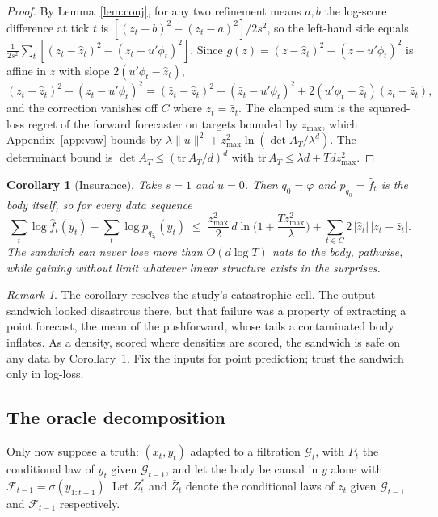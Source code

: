 \documentclass[article]{jss}
\newtheorem{corollary}{Corollary}
\theoremstyle{remark}
\newtheorem{remark}{Remark}
\newcommand{\zmax}{z_{\max}}
\begin{document}
\begin{proof}
By Lemma~\ref{lem:conj}, for any two refinement means $a, b$ the log-score
difference at tick $t$ is $[(z_t - b)^2 - (z_t - a)^2]/2s^2$, so the
left-hand side equals $\tfrac{1}{2s^2}\sum_t [(z_t - \hat z_t)^2 - (z_t -
u'\phi_t)^2]$. Since $g(z) = (z - \hat z_t)^2 - (z - u'\phi_t)^2$ is affine
in $z$ with slope $2(u'\phi_t - \hat z_t)$,
\[
(z_t - \hat z_t)^2 - (z_t - u'\phi_t)^2 = (\bar z_t - \hat z_t)^2 - (\bar z_t
- u'\phi_t)^2 + 2(u'\phi_t - \hat z_t)(z_t - \bar z_t),
\]
and the correction vanishes off $C$ where $z_t = \bar z_t$. The clamped sum
is the squared-loss regret of the forward forecaster on targets bounded by
$\zmax$, which Appendix~\ref{app:vaw} bounds by $\lambda\|u\|^2 + \zmax^2
\ln(\det A_T/\lambda^d)$. The determinant bound is
$\det A_T \le (\mathrm{tr}\, A_T/d)^d$ with $\mathrm{tr}\,A_T \le \lambda d +
T d \zmax^2$.
\end{proof}

\begin{corollary}[Insurance] \label{cor:insurance}
Take $s = 1$ and $u = 0$. Then $q_0 = \varphi$ and $p_{q_0} = \hat f_t$ is
the body itself, so for every data sequence
\[
\sum_t \log \hat f_t(y_t) - \sum_t \log p_{q_{\hat z_t}}(y_t)
\;\le\; \frac{\zmax^2}{2}\, d \ln\!\Big(1 + \frac{T \zmax^2}{\lambda}\Big)
+ \sum_{t\in C} 2\,|\hat z_t|\,|z_t - \bar z_t|.
\]
The sandwich can never lose more than $O(d \log T)$ nats to the body,
pathwise, while gaining without limit whatever linear structure exists in the
surprises.
\end{corollary}

\begin{remark}
The corollary resolves the study's catastrophic cell. The output sandwich
looked disastrous there, but that failure was a property of extracting a
point forecast, the mean of the pushforward, whose tails a contaminated body
inflates. As a density, scored where densities are scored, the sandwich is
safe on any data by Corollary~\ref{cor:insurance}. Fix the inputs for point
prediction; trust the sandwich only in log-loss.
\end{remark}

\subsection{The oracle decomposition}

Only now suppose a truth: $(x_t, y_t)$ adapted to a filtration $\mathcal
G_t$, with $P_t$ the conditional law of $y_t$ given $\mathcal G_{t-1}$, and
let the body be causal in $y$ alone with $\mathcal F_{t-1} =
\sigma(y_{1:t-1})$. Let $Z_t^*$ and $\bar Z_t$ denote the conditional laws of
$z_t$ given $\mathcal G_{t-1}$ and $\mathcal F_{t-1}$ respectively.
\end{document}
